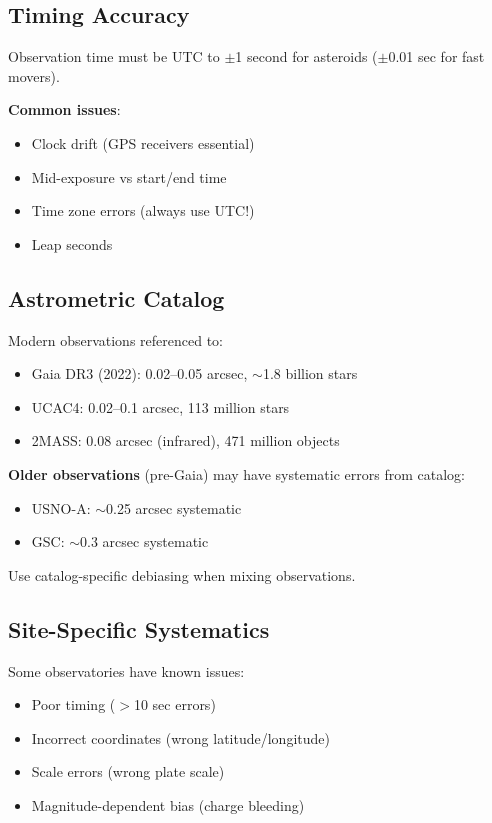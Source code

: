 \subsection{Timing Accuracy}

Observation time must be UTC to $\pm$1 second for asteroids ($\pm$0.01 sec for fast movers).

\textbf{Common issues}:
\begin{itemize}
    \item Clock drift (GPS receivers essential)
    \item Mid-exposure vs start/end time
    \item Time zone errors (always use UTC!)
    \item Leap seconds
\end{itemize}

\subsection{Astrometric Catalog}

Modern observations referenced to:
\begin{itemize}
    \item Gaia DR3 (2022): 0.02--0.05 arcsec, $\sim$1.8 billion stars
    \item UCAC4: 0.02--0.1 arcsec, 113 million stars
    \item 2MASS: 0.08 arcsec (infrared), 471 million objects
\end{itemize}

\textbf{Older observations} (pre-Gaia) may have systematic errors from catalog:
\begin{itemize}
    \item USNO-A: $\sim$0.25 arcsec systematic
    \item GSC: $\sim$0.3 arcsec systematic
\end{itemize}

Use catalog-specific debiasing when mixing observations.

\subsection{Site-Specific Systematics}

Some observatories have known issues:
\begin{itemize}
    \item Poor timing ($>$10 sec errors)
    \item Incorrect coordinates (wrong latitude/longitude)
    \item Scale errors (wrong plate scale)
    \item Magnitude-dependent bias (charge bleeding)
\end{itemize}

